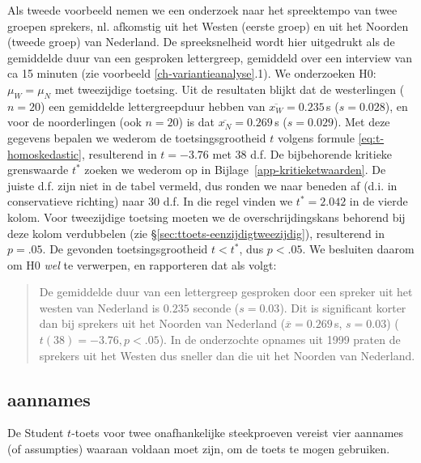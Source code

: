 \documentclass[
]{book}
\begin{document}
Als tweede voorbeeld nemen we een onderzoek naar het spreektempo van
twee groepen sprekers, nl. afkomstig uit het Westen (eerste groep) en
uit het Noorden (tweede groep) van Nederland. De spreeksnelheid wordt
hier uitgedrukt als de gemiddelde duur van een gesproken lettergreep,
gemiddeld over een interview van ca 15 minuten (zie voorbeeld
\ref{ch-variantieanalyse}.1). We onderzoeken H0: \(\mu_W = \mu_N\) met
tweezijdige toetsing. Uit de resultaten blijkt dat de westerlingen
(\(n=20\)) een gemiddelde lettergreepduur hebben van
\(\overline{x_W}=0.235\) s (\(s=0.028\)), en voor de noorderlingen (ook
\(n=20\)) is dat \(\overline{x_N}=0.269\) s (\(s=0.029\)). Met deze gegevens
bepalen we wederom de toetsingsgrootheid \(t\) volgens formule
\eqref{eq:t-homoskedastic}, resulterend in \(t=-3.76\) met 38 d.f. De
bijbehorende kritieke grenswaarde \(t^*\) zoeken we wederom op in
Bijlage~\ref{app-kritieketwaarden}. De juiste d.f. zijn niet in de
tabel vermeld, dus ronden we naar beneden af (d.i. in conservatieve
richting) naar 30 d.f. In die regel vinden we \(t^*=2.042\) in de vierde
kolom. Voor tweezijdige toetsing moeten we de overschrijdingskans
behorend bij deze kolom verdubbelen (zie
§\ref{sec:ttoets-eenzijdigtweezijdig}), resulterend in \(p=.05\). De
gevonden toetsingsgrootheid \(t < t^*\), dus \(p<.05\). We besluiten daarom
om H0 \emph{wel} te verwerpen, en rapporteren dat als volgt:

\begin{quote}
De gemiddelde duur van een lettergreep gesproken door een spreker uit
het westen van Nederland is \(0.235\) seconde (\(s=0.03\)). Dit is
significant korter dan bij sprekers uit het Noorden van Nederland
(\(\overline{x}=0.269\) s, \(s=0.03\)) (\(t(38)=-3.76, p<.05\)). In de
onderzochte opnames uit 1999 praten de sprekers uit het Westen dus
sneller dan die uit het Noorden van Nederland.
\end{quote}

\subsection{aannames}\label{sec:ttoets-ongepaard-aannames}

De Student \(t\)-toets voor twee onafhankelijke steekproeven vereist vier
aannames (of assumpties) waaraan voldaan moet zijn, om de toets te mogen
gebruiken.
\end{document}
